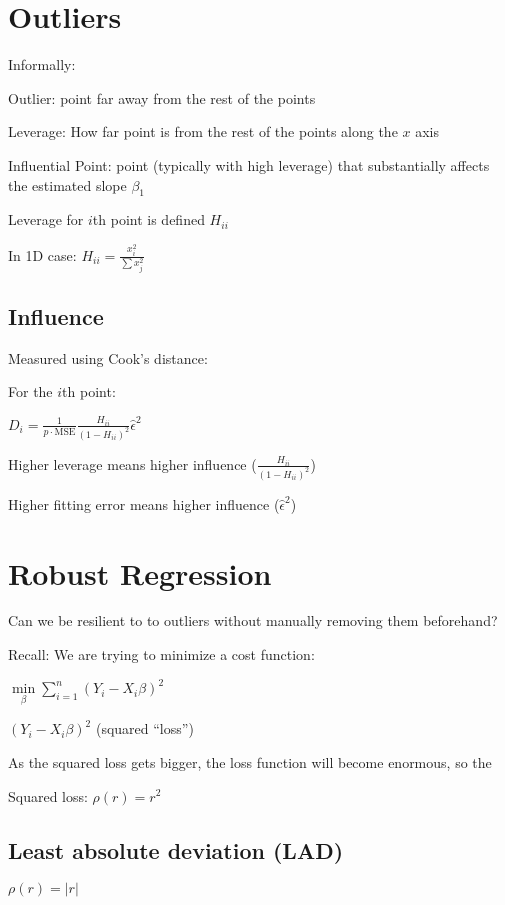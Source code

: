 \documentclass[twoside]{article}
\begin{document}
\section{Outliers}

Informally: 

Outlier: point far away from the rest of the points

Leverage: How far point is from the rest of the points along the $x$ axis

Influential Point: point (typically with high leverage) that substantially affects the estimated slope $\beta_1$

Leverage for $i$th point is defined $H_{ii}$

In 1D case: $H_{ii} = \frac{x_i^2}{\sum x_j^2}$

\subsection{Influence}

Measured using Cook's distance: 

For the $i$th point: 

$D_i = \frac{1}{p \cdot \text{MSE}} \frac{H_{ii}}{(1-H_{ii})^2}\hat{\epsilon}^2$

Higher leverage means higher influence ($\frac{H_{ii}}{(1-H_{ii})^2}$)

Higher fitting error means higher influence ($\hat{\epsilon}^2$)

\section{Robust Regression}

Can we be resilient to to outliers without manually removing them beforehand?

Recall: We are trying to minimize a cost function:

$\min\limits_{\beta} \sum\limits_{i=1}^n ( Y_i - X_i \beta)^2$

$( Y_i - X_i \beta)^2$ (squared ``loss'')

As the squared loss gets bigger, the loss function will become enormous, so the 

Squared loss: $\rho(r) = r^2$


\subsection{Least absolute deviation (LAD)}

$\rho(r) = |r|$
\end{document}
